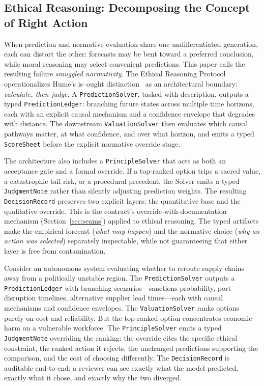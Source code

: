 \documentclass[11pt]{article}
\let\oldtexttt\texttt
\renewcommand{\texttt}[1]{\oldtexttt{\small #1}}
\begin{document}
\subsection{Ethical Reasoning: Decomposing the Concept of Right Action}
\label{sec:prediction}

When prediction and normative evaluation share one undifferentiated generation, each can distort the other: forecasts may be bent toward a preferred conclusion, while moral reasoning may select convenient predictions. This paper calls the resulting failure \emph{smuggled normativity}. The Ethical Reasoning Protocol operationalizes Hume's is--ought distinction~\cite{hume1739} as an architectural boundary: \emph{calculate, then judge}. A \texttt{PredictionSolver}, tasked with description, outputs a typed \texttt{PredictionLedger}: branching future states across multiple time horizons, each with an explicit causal mechanism and a confidence envelope that degrades with distance. The downstream \texttt{ValuationSolver} then evaluates which causal pathways matter, at what confidence, and over what horizon, and emits a typed \texttt{ScoreSheet} before the explicit normative override stage.

The architecture also includes a \texttt{PrincipleSolver} that acts as both an acceptance gate and a formal override. If a top-ranked option trips a sacred value, a catastrophic tail risk, or a procedural precedent, the Solver emits a typed \texttt{JudgmentNote} rather than silently adjusting prediction weights. The resulting \texttt{DecisionRecord} preserves two explicit layers: the quantitative base and the qualitative override. This is the contract's override-with-documentation mechanism (Section~\ref{sec:seams}) applied to ethical reasoning. The typed artifacts make the empirical forecast (\emph{what may happen}) and the normative choice (\emph{why an action was selected}) separately inspectable, while not guaranteeing that either layer is free from contamination.

Consider an autonomous system evaluating whether to reroute supply chains away from a politically unstable region. The \texttt{PredictionSolver} outputs a \texttt{PredictionLedger} with branching scenarios---sanctions probability, port disruption timelines, alternative supplier lead times---each with causal mechanisms and confidence envelopes. The \texttt{ValuationSolver} ranks options purely on cost and reliability. But the top-ranked option concentrates economic harm on a vulnerable workforce. The \texttt{PrincipleSolver} emits a typed \texttt{JudgmentNote} overriding the ranking: the override cites the specific ethical constraint, the ranked action it rejects, the unchanged predictions supporting the comparison, and the cost of choosing differently. The \texttt{DecisionRecord} is auditable end-to-end: a reviewer can see exactly what the model predicted, exactly what it chose, and exactly why the two diverged.
\end{document}
